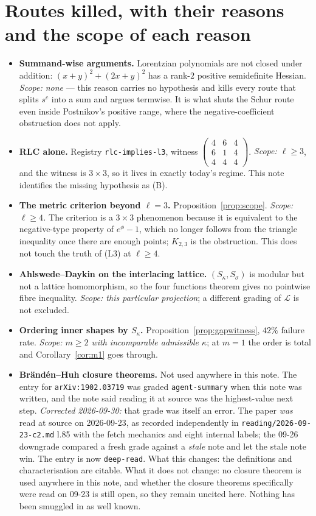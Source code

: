 \documentclass[11pt]{article}
\theoremstyle{plain}
\theoremstyle{definition}
\begin{document}
\section{Routes killed, with their reasons and the scope of each reason}

\begin{itemize}
\item \textbf{Summand-wise arguments.} Lorentzian polynomials are not closed under addition:
$(x+y)^2+(2x+y)^2$ has a rank-$2$ positive semidefinite Hessian. \emph{Scope: none} --- this reason
carries no hypothesis and kills every route that splits $s^c$ into a sum and argues termwise. It is
what shuts the Schur route even inside Postnikov's positive range, where the negative-coefficient
obstruction does not apply.
\item \textbf{RLC alone.} Registry \texttt{rlc-implies-l3}, witness
$\left(\begin{smallmatrix}4&6&4\\6&1&4\\4&4&4\end{smallmatrix}\right)$. \emph{Scope: $\ell\ge3$}, and
the witness is $3\times3$, so it lives in exactly today's regime. This note identifies the missing
hypothesis as (B).
\item \textbf{The metric criterion beyond $\ell=3$.} Proposition~\ref{prop:scope}. \emph{Scope:
$\ell\ge4$.} The criterion is a $3\times3$ phenomenon because it is equivalent to the negative-type
property of $e^{\phi}-1$, which no longer follows from the triangle inequality once there are enough
points; $K_{2,3}$ is the obstruction. This does not touch the truth of (L3) at $\ell\ge4$.
\item \textbf{Ahlswede--Daykin on the interlacing lattice.} $(S_\kappa,S_\sigma)$ is modular but not
a lattice homomorphism, so the four functions theorem gives no pointwise fibre inequality.
\emph{Scope: this particular projection}; a different grading of $\mathcal{L}$ is not excluded.
\item \textbf{Ordering inner shapes by $S_\kappa$.} Proposition~\ref{prop:gapwitness}, $42\%$ failure
rate. \emph{Scope: $m\ge2$ with incomparable admissible $\kappa$}; at $m=1$ the order is total and
Corollary~\ref{cor:m1} goes through.
\item \textbf{Br\"and\'en--Huh closure theorems.} Not used anywhere in this note. The entry for
\texttt{arXiv:1902.03719} was graded \texttt{agent-summary} when this note was written, and the note
said reading it at source was the highest-value next step. \emph{Corrected 2026-09-30:} that grade was
itself an error. The paper \emph{was} read at source on 2026-09-23, as recorded independently in
\texttt{reading/2026-09-23-c2.md} l.85 with the fetch mechanics and eight internal labels; the 09-26
downgrade compared a fresh grade against a \emph{stale} note and let the stale note win. The entry is
now \texttt{deep-read}. What this changes: the definitions and characterisation are citable. What it
does not change: no closure theorem is used anywhere in this note, and whether the closure theorems
specifically were read on 09-23 is still open, so they remain uncited here. Nothing has been smuggled
in as well known.
\end{itemize}
\end{document}
